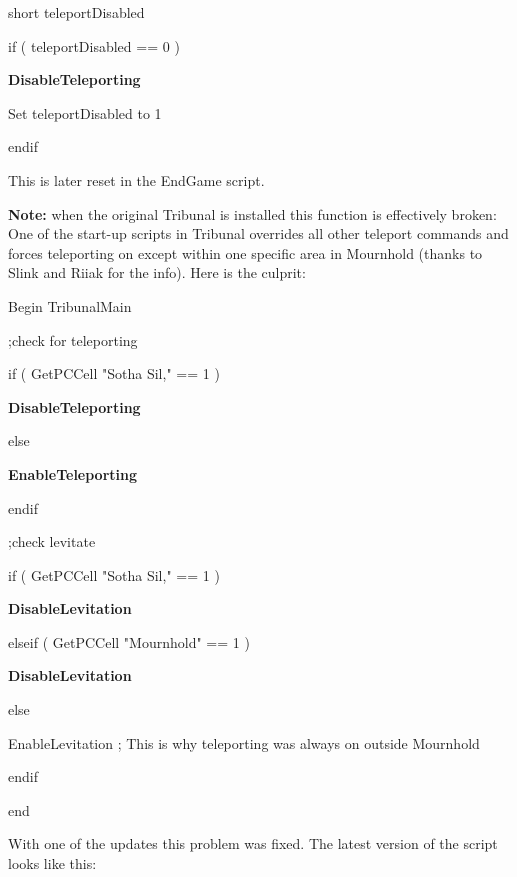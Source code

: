 \documentclass[
]{article}
\begin{document}
short teleportDisabled

if ( teleportDisabled == 0 )

\textbf{DisableTeleporting}

Set teleportDisabled to 1

endif

This is later reset in the EndGame script.

\textbf{Note:} when the original Tribunal is installed this function is
effectively broken: One of the start-up scripts in Tribunal overrides
all other teleport commands and forces teleporting on except within one
specific area in Mournhold (thanks to Slink and Riiak for the info).
Here is the culprit:

Begin TribunalMain

;check for teleporting

if ( GetPCCell "Sotha Sil," == 1 )

\textbf{DisableTeleporting}

else

\textbf{EnableTeleporting}

endif

;check levitate

if ( GetPCCell "Sotha Sil," == 1 )

\textbf{DisableLevitation}

elseif ( GetPCCell "Mournhold" == 1 )

\textbf{DisableLevitation}

else

EnableLevitation ; This is why teleporting was always on outside
Mournhold

endif

end

With one of the updates this problem was fixed. The latest version of
the script looks like this:
\end{document}
